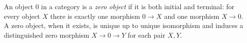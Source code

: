
An object $0$ in a category is a \emph{zero object} if it is both initial and terminal: for every object $X$ there is exactly one morphism $0\to X$ and one morphism $X\to0$. A zero object, when it exists, is unique up to unique isomorphism and induces a distinguished zero morphism $X\to0\to Y$ for each pair $X,Y$.
